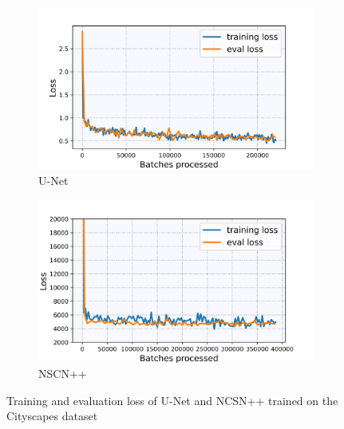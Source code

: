 %
\begin{figure}[] \label{fig:5.8}
    \centering
    \begin{subfigure}[b]{0.49\textwidth}
        \includegraphics[width=\textwidth]{Chapters/figures/experiments/cityscapes/loss_city_seg.jpg}
        \caption{U-Net}
    \end{subfigure}
    \begin{subfigure}[b]{0.49\textwidth}
        \includegraphics[width=\textwidth]{Chapters/figures/experiments/cityscapes/loss_city_ncsn.jpg}
        \caption{NSCN++}
    \end{subfigure}
    \caption[Losses of U-Net/NCSN++ on Cityscapes dataset]{Training and evaluation loss of U-Net and NCSN++ trained on the Cityscapes dataset}
\end{figure}
%
